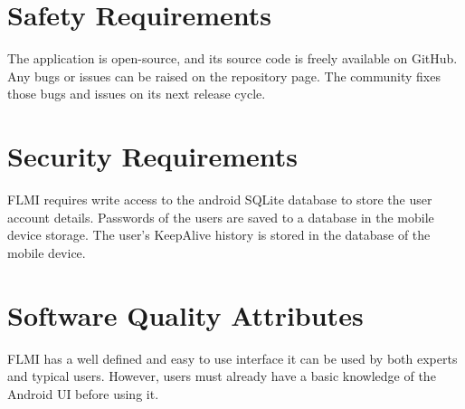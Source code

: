 \section{Safety Requirements}
The application is open-source, and its source code is freely available on GitHub. Any bugs or issues can be raised on the repository page. The community fixes those bugs and issues on its next release cycle.

\section{Security Requirements}
FLMI requires write access to the android SQLite database to store the user account details. Passwords of the users are saved to a database in the mobile device storage. The user's KeepAlive history is stored in the database of the mobile device.

\section{Software Quality Attributes}
FLMI has a well defined and easy to use interface it can be used by both experts and typical users. However, users must already have a basic knowledge of the Android UI before using it.



